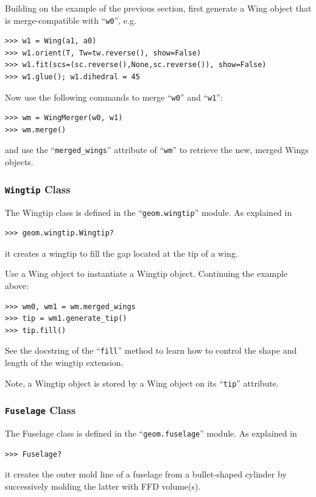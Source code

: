 \documentclass[]{article}
\begin{document}
Building on the example of the previous section, first generate a Wing 
object that is merge-compatible with ``\texttt{w0}'', e.g.
\begin{verbatim}
>>> w1 = Wing(a1, a0)
>>> w1.orient(T, Tw=tw.reverse(), show=False)
>>> w1.fit(scs=(sc.reverse(),None,sc.reverse()), show=False)
>>> w1.glue(); w1.dihedral = 45
\end{verbatim}
Now use the following commands to merge ``\texttt{w0}'' and 
``\texttt{w1}'':
\begin{verbatim}
>>> wm = WingMerger(w0, w1)
>>> wm.merge()
\end{verbatim}
and use the ``\texttt{merged\_wings}'' attribute of ``\texttt{wm}'' to 
retrieve the new, merged Wings objects.

\subsubsection{\texttt{Wingtip} Class}
\label{subsubsec:wingtip}

The Wingtip class is defined in the ``\texttt{geom.wingtip}'' module.  
As explained in
\begin{verbatim}
>>> geom.wingtip.Wingtip?
\end{verbatim}
it creates a wingtip to fill the gap located at the tip of a wing.

Use a Wing object to instantiate a Wingtip object.  Continuing the 
example above:
\begin{verbatim}
>>> wm0, wm1 = wm.merged_wings
>>> tip = wm1.generate_tip()
>>> tip.fill()
\end{verbatim}
See the docstring of the ``\texttt{fill}'' method to learn how to 
control the shape and length of the wingtip extension.

Note, a Wingtip object is stored by a Wing object on its 
``\texttt{tip}'' attribute.

\subsubsection{\texttt{Fuselage} Class}
\label{subsubsec:fuselage}

The Fuselage class is defined in the ``\texttt{geom.fuselage}'' module.  
As explained in
\begin{verbatim}
>>> Fuselage?
\end{verbatim}
it creates the outer mold line of a fuselage from a bullet-shaped 
cylinder by successively molding the latter with FFD volume(s).
\end{document}

